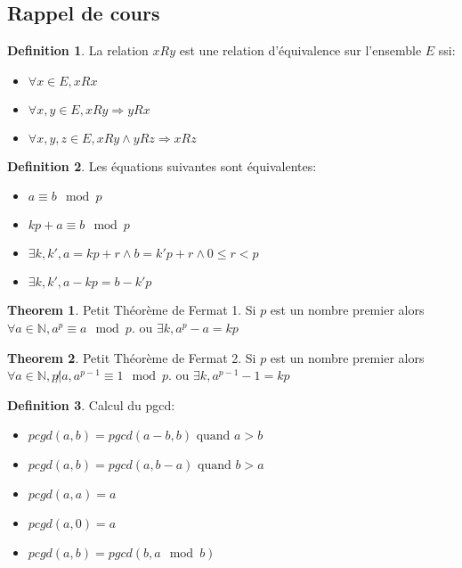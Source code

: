 \documentclass[]{book}
\theoremstyle{definition}
\newtheorem{defn}{Definition}
\newtheorem{thm}{Theorem}
\newcommand{\bb}[1]{\mathbb{#1}}
\newcommand{\N}{\bb{N}}
\begin{document}
\subsection*{Rappel de cours}

\begin{defn}
La relation $xRy$ est une relation d'\'equivalence sur l'ensemble $E$ ssi:
\begin{itemize}
\item $\forall x \in E, xRx$
\item $\forall x,y \in E, xRy \Rightarrow yRx$
\item $\forall x,y,z \in E, xRy \wedge yRz \Rightarrow xRz$
\end{itemize}
\end{defn}


\begin{defn}
Les \'equations suivantes sont \'equivalentes:
\begin{itemize}
\item $a \equiv b \mod p$
\item $kp+a \equiv b \mod p$
\item $\exists k,k', a = kp + r \land b = k'p +r \land 0 \leq r < p$
\item $\exists k,k', a - kp = b - k'p$
\end{itemize}
\end{defn}

\begin{thm}
Petit Th\'eor\`eme de Fermat 1. Si $p$ est un nombre premier alors $\forall a \in \N, a^p \equiv a \mod p$. ou $\exists k, a^p-a = kp$
\end{thm}

\begin{thm}
Petit Th\'eor\`eme de Fermat 2. Si $p$ est un nombre premier alors $\forall a \in \N, p \not | a, a^{p-1} \equiv 1 \mod p$. ou $\exists k, a^{p-1}-1 = kp$
\end{thm}

\begin{defn}
Calcul du pgcd:
\begin{itemize}
\item $pcgd(a,b) = pgcd(a-b,b) \text{ quand } a > b$
\item $pcgd(a,b) = pgcd(a,b-a) \text{ quand } b > a$
\item $pcgd(a,a) = a$
\item $pcgd(a,0) = a$
\item $pcgd(a,b) = pgcd(b,a \mod b)$
\end{itemize}
\end{defn}
\end{document}
